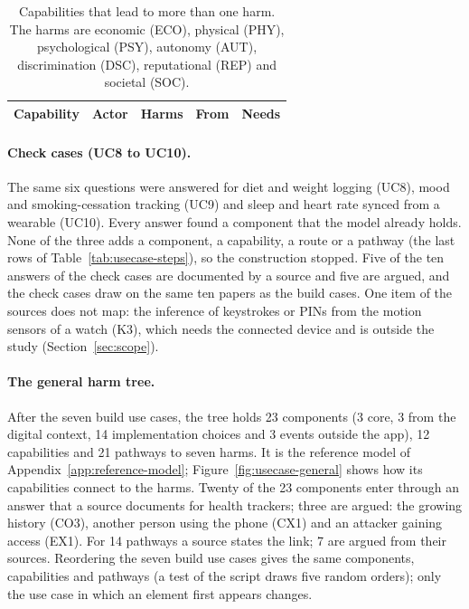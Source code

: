 \begin{table}[H]
\centering
\begin{singlespace}
\caption[Common sub-trees of the harm trees]{Capabilities that lead to more than one harm. The
harms are economic (ECO), physical (PHY), psychological (PSY), autonomy (AUT), discrimination
(DSC), reputational (REP) and societal (SOC).}
\label{tab:usecase-common}
\footnotesize
\begin{tabularx}{\textwidth}{@{}>{\raggedright\arraybackslash}p{4.0cm}>{\raggedright\arraybackslash}p{2.4cm}>{\raggedright\arraybackslash}p{1.8cm}l>{\raggedright\arraybackslash}X@{}}
\toprule
\textbf{Capability} & \textbf{Actor} & \textbf{Harms} & \textbf{From} & \textbf{Needs} \\
\midrule
\end{tabularx}
\end{singlespace}
\end{table}

\paragraph{Check cases (UC8 to UC10).} The same six questions were answered for diet and weight
logging (UC8), mood and smoking-cessation tracking (UC9) and sleep and heart rate synced from a
wearable (UC10). Every answer found a component that the model already holds. None of the three
adds a component, a capability, a route or a pathway (the last rows of
Table~\ref{tab:usecase-steps}), so the construction stopped. Five of the ten answers of the
check cases are documented by a source and five are argued, and the check cases draw on the
same ten papers as the build cases. One item of the sources does not
map: the inference of keystrokes or PINs from the motion sensors of a watch (K3), which needs
the connected device and is outside the study (Section~\ref{sec:scope}).

\paragraph{The general harm tree.} After the seven build use cases, the tree holds 23
components (3 core, 3 from the digital context, 14 implementation choices and 3 events outside
the app), 12 capabilities and 21 pathways to seven harms. It is the reference model of
Appendix~\ref{app:reference-model}; Figure~\ref{fig:usecase-general} shows how its capabilities
connect to the harms. Twenty of the 23 components enter through an answer that a source
documents for health trackers; three are argued: the growing history (CO3), another person
using the phone (CX1) and an attacker gaining access (EX1). For 14 pathways a source states the
link; 7 are argued from their sources.
Reordering the seven build use cases gives the same components, capabilities and pathways (a
test of the script draws five random orders); only the use case in which an element first appears
changes.

